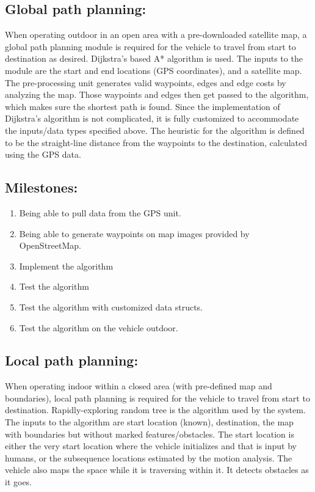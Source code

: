 \documentclass[compsoc,draftclsnofoot,onecolumn,10pt]{IEEEtran}
\begin{document}
\subsection{Global path planning:}
When operating outdoor in an open area with a pre-downloaded satellite map, a global path planning module is required for the vehicle to travel from start to destination as desired. Dijkstra's based A* algorithm is used. The inputs to the module are the start and end locations (GPS coordinates), and a satellite map. The pre-processing unit generates valid waypoints, edges and edge costs by analyzing the map. Those waypoints and edges then get passed to the algorithm, which makes sure the shortest path is found. Since the implementation of Dijkstra’s algorithm is not complicated, it is fully customized to accommodate the inputs/data types specified above. The heuristic for the algorithm is defined to be the straight-line distance from the waypoints to the destination, calculated using the GPS data.\par
\subsection{Milestones:}
\begin{enumerate}
	\item Being able to pull data from the GPS unit.
	\item Being able to generate waypoints on map images provided by OpenStreetMap.
	\item Implement the algorithm
	\item Test the algorithm
	\item Test the algorithm with customized data structs.
	\item Test the algorithm on the vehicle outdoor.
\end{enumerate}

\subsection{Local path planning:}
When operating indoor within a closed area (with pre-defined map and boundaries), local path planning is required for the vehicle to travel from start to destination. Rapidly-exploring random tree is the algorithm used by the system. The inputs to the algorithm are start location (known), destination, the map with boundaries but without marked features/obstacles. The start location is either the very start location where the vehicle initializes and that is input by humans, or the subsequence locations estimated by the motion analysis. The vehicle also maps the space while it is traversing within it. It detects obstacles as it goes.\par
\end{document}
